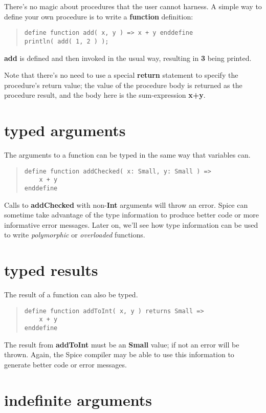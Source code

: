 \documentclass{report}
\begin{document}
There's no magic about procedures that the user cannot harness. A simple
way to define your own procedure is to write a {\bf function} definition:

\begin{quote}
\begin{verbatim}
define function add( x, y ) => x + y enddefine
println( add( 1, 2 ) );
\end{verbatim}
\end{quote}
{\bf add} is defined and then  invoked in the usual way, resulting in {\bf 3} being
printed.

Note that there's no need to use a special {\bf return} statement to specify the
procedure's return value; the value of the procedure body is returned as the
procedure result, and the body here is the sum-expression {\bf x+y}.

\section{typed arguments}


The arguments to a function can be typed in the same way that variables can.

\begin{quote}
\begin{verbatim}
define function addChecked( x: Small, y: Small ) =>
    x + y
enddefine
\end{verbatim}
\end{quote}
Calls to {\bf addChecked} with non-{\bf Int} arguments will throw an error. Spice
can sometime take advantage of the type information to produce better code
or more informative error messages. Later on, we'll see how type information
can be used to write {\em polymorphic} or {\em overloaded} functions.\section{typed results}


The result of a function can also be typed.

\begin{quote}
\begin{verbatim}
define function addToInt( x, y ) returns Small =>
    x + y
enddefine
\end{verbatim}
\end{quote}
The result from {\bf addToInt} must be an {\bf Small} value; if not an error will be
thrown. Again, the Spice compiler may be able to use this information to
generate better code or error messages.\section{indefinite arguments}
\end{document}
